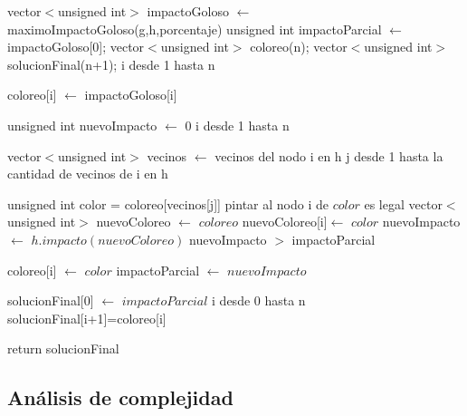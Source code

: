 \begin{algorithm}[H]
\caption{} 
\begin{codebox}

\li
\li vector$<$unsigned int$>$ impactoGoloso  $\gets$ maximoImpactoGoloso(g,h,porcentaje)
\li unsigned int impactoParcial $\gets$ impactoGoloso[0];
\li vector$<$unsigned int$>$ coloreo(n);
\li
\li vector$<$unsigned int$>$ solucionFinal(n+1);
\li
\li \For i desde 1 hasta n \Do
    
\li 	coloreo[i] $\gets$ impactoGoloso[i]
    
    \End
\li

\li unsigned int nuevoImpacto $\gets$ 0
\li
\li	\For i desde 1 hasta n \Do
	
\li
\li		vector$<$unsigned int$>$ vecinos $\gets$ vecinos del nodo i en h
\li
\li 	\For j desde 1 hasta la cantidad de vecinos de i en h \Do

\li				unsigned int color = coloreo[vecinos[j]]
\li
\li				\If pintar al nodo i de $color$ es legal \Do			
\li						vector$<$unsigned int$>$ nuevoColoreo $\gets$ \quad $coloreo$
\li						nuevoColoreo[i]$ \gets$ \quad $color$
\li                		nuevoImpacto $ \gets$ \quad $h.impacto(nuevoColoreo)$
\li
\li                		\If nuevoImpacto $>$ impactoParcial \Do
                
\li                			coloreo[i] $\gets$ \quad $color$
\li                   			impactoParcial $\gets$ \quad $nuevoImpacto$
                   		\End
\li
                \End
        \End
    \End

\li
\li 		solucionFinal[0] $\gets$ \quad $impactoParcial$
\li
\li \For i desde 0 hasta n \Do
\li		solucionFinal[i+1]=coloreo[i]
	\End    

\li
\li return solucionFinal
\End
\end{codebox}
\end{algorithm}

\subsection{Análisis de complejidad}

